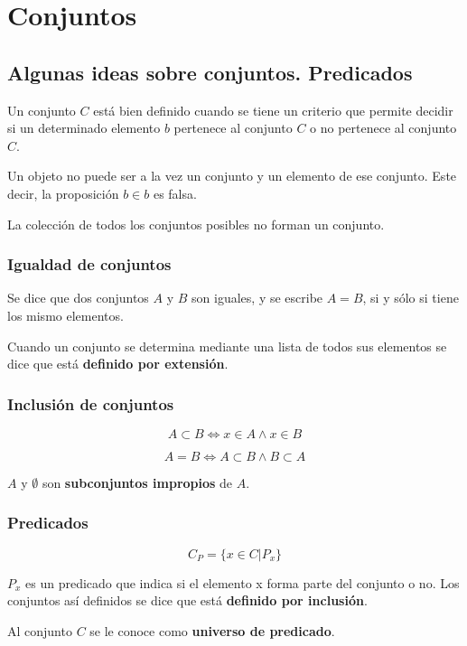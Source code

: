 \chapter{Conjuntos}

\section{Algunas ideas sobre conjuntos. Predicados}

Un conjunto $C$ está bien definido cuando se tiene un criterio que permite decidir si un determinado elemento $b$ pertenece al conjunto $C$ o no pertenece al conjunto $C$.

Un objeto no puede ser a la vez un conjunto y un elemento de ese conjunto. Este decir, la proposición $b \in b$ es falsa.

La colección de todos los conjuntos posibles no forman un conjunto.

\subsection{Igualdad de conjuntos}

Se dice que dos conjuntos $A$ y $B$ son iguales, y se escribe $A=B$, si y sólo si tiene los mismo elementos.

Cuando un conjunto se determina mediante una lista de todos sus elementos se dice que está \textbf{definido por extensión}.

\subsection{Inclusión de conjuntos}

\[
A \subset B \Leftrightarrow x \in A \wedge x \in B
\]

\[
A = B \Leftrightarrow A \subset B \wedge B \subset A
\]

$A$ y $\emptyset$ son \textbf{subconjuntos impropios} de $A$.

\subsection{Predicados}

\[
C_P = \{ x \in C | P_x \}
\]

$P_x$ es un predicado que indica si el elemento x forma parte del conjunto o no. Los conjuntos así definidos se dice que está \textbf{definido por inclusión}.

Al conjunto $C$ se le conoce como \textbf{universo de predicado}.

